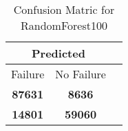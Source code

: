 \begin{table}[] 
\caption{Confusion Matric for RandomForest100} 
\label{Table: Prediction Accuracy-DMDRandomForest100OnlySunEKF-ignoreReflectionEKF-top2-Reflection} 
\centering 
\begin{tabular} 
 {@{}ccc@{}} 
\toprule 
\multicolumn{2}{c}{\textbf{Predicted}}
 \\ \midrule 
\multicolumn{1}{|c|}{Failure} & 
\multicolumn{1}{c|}{No Failure}
 \\ \midrule 
\multicolumn{1}{|c|}{\color{green}\textbf{87631}} & 
\multicolumn{1}{c|}{\color{red}\textbf{8636}}
 \\ \midrule 
\multicolumn{1}{|c|}{\color{red}\textbf{14801}} & 
\multicolumn{1}{c|}{\color{green}\textbf{59060}}
 \\ \bottomrule 
\end{tabular} 
\end{table} 
